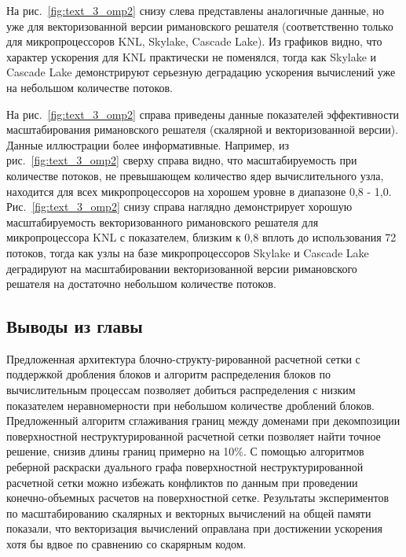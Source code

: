 На рис.~\ref{fig:text_3_omp2} снизу слева представлены аналогичные данные, но уже для векторизованной версии римановского решателя (соответственно только для микропроцессоров KNL, Skylake, Cascade Lake).
Из графиков видно, что характер ускорения для KNL практически не поменялся, тогда как Skylake и Cascade Lake демонстрируют серьезную деградацию ускорения вычислений уже на небольшом количестве потоков.

На рис.~\ref{fig:text_3_omp2} справа приведены данные показателей эффективности масштабирования римановского решателя (скалярной и векторизованной версии).
Данные иллюстрации более информативные.
Например, из рис.~\ref{fig:text_3_omp2} сверху справа видно, что масштабируемость при количестве потоков, не превышающем количество ядер вычислительного узла, находится для всех микропроцессоров на хорошем уровне в диапазоне 0,8 - 1,0.
Рис.~\ref{fig:text_3_omp2} снизу справа наглядно демонстрирует хорошую масштабируемость векторизованного римановского решателя для микропроцессора KNL с показателем, близким к 0,8 вплоть до использования 72 потоков, тогда как узлы на базе микропроцессоров Skylake и Cascade Lake деградируют на масштабировании векторизованной версии римановского решателя на достаточно небольшом количестве потоков.


\subsection{Выводы из главы}

Предложенная архитектура блочно-структу-рированной расчетной сетки с поддержкой дробления блоков и алгоритм распределения блоков по вычислительным процессам позволяет добиться распределения с низким показателем неравномерности при небольшом количестве дроблений блоков.
Предложенный алгоритм сглаживания границ между доменами при декомпозиции поверхностной неструктурированной расчетной сетки позволяет найти точное решение, снизив длины границ примерно на 10\%.
С помощью алгоритмов реберной раскраски дуального графа поверхностной неструктурированной расчетной сетки можно избежать конфликтов по данным при проведении конечно-объемных расчетов на поверхностной сетке.
Результаты экспериментов по масштабированию скалярных и векторных вычислений на общей памяти показали, что векторизация вычислений оправлана при достижении ускорения хотя бы вдвое по сравнению со скарярным кодом.

